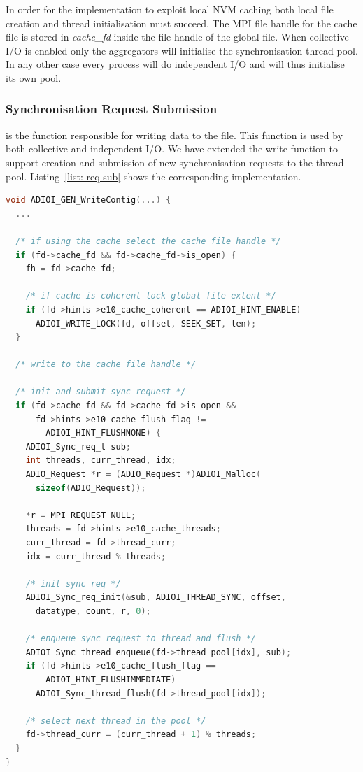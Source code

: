 In order for the implementation to exploit local NVM caching both local file creation and thread initialisation must succeed. The MPI file handle for the cache file is stored in \textit{cache\_fd} inside the file handle of the global file. When collective I/O is enabled only the aggregators will initialise the synchronisation thread pool. In any other case every process will do independent I/O and will thus initialise its own pool.

\subsubsection{Synchronisation Request Submission}
\label{subsubsec: sync-req-sub}
 is the function responsible for writing data to the file. This function is used by both collective and independent I/O. We have extended the write function to support creation and submission of new synchronisation requests to the thread pool. Listing~\ref{list: req-sub} shows the corresponding implementation.

\begin{lstlisting}[language=C, caption=Synchronisation Request Submission, label={list: req-sub}]
void ADIOI_GEN_WriteContig(...) {
  ...

  /* if using the cache select the cache file handle */
  if (fd->cache_fd && fd->cache_fd->is_open) {
    fh = fd->cache_fd;

    /* if cache is coherent lock global file extent */ 
    if (fd->hints->e10_cache_coherent == ADIOI_HINT_ENABLE)
      ADIOI_WRITE_LOCK(fd, offset, SEEK_SET, len);
  }

  /* write to the cache file handle */

  /* init and submit sync request */
  if (fd->cache_fd && fd->cache_fd->is_open && 
      fd->hints->e10_cache_flush_flag != 
        ADIOI_HINT_FLUSHNONE) {
    ADIOI_Sync_req_t sub;
    int threads, curr_thread, idx;
    ADIO_Request *r = (ADIO_Request *)ADIOI_Malloc(
      sizeof(ADIO_Request));

    *r = MPI_REQUEST_NULL;
    threads = fd->hints->e10_cache_threads;
    curr_thread = fd->thread_curr;
    idx = curr_thread % threads;

    /* init sync req */
    ADIOI_Sync_req_init(&sub, ADIOI_THREAD_SYNC, offset, 
      datatype, count, r, 0);

    /* enqueue sync request to thread and flush */
    ADIOI_Sync_thread_enqueue(fd->thread_pool[idx], sub);
    if (fd->hints->e10_cache_flush_flag == 
        ADIOI_HINT_FLUSHIMMEDIATE)
      ADIOI_Sync_thread_flush(fd->thread_pool[idx]);

    /* select next thread in the pool */
    fd->thread_curr = (curr_thread + 1) % threads;
  }
}
\end{lstlisting}

